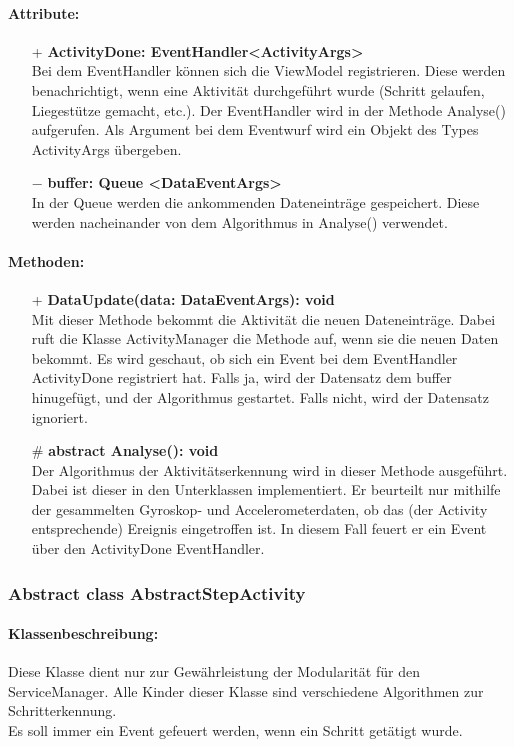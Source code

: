 \documentclass[a4paper,12pt]{article}
\begin{document}
	\paragraph{Attribute:}
	\begin{itemize}
		\item[+] \textbf{ActivityDone: EventHandler<ActivityArgs>}\\Bei dem EventHandler können sich die ViewModel registrieren. Diese werden benachrichtigt, wenn eine Aktivität durchgeführt wurde (Schritt gelaufen, Liegestütze gemacht, etc.). Der EventHandler wird in der Methode Analyse() aufgerufen. Als Argument bei dem Eventwurf wird ein Objekt des Types ActivityArgs übergeben.
		\item [$-$] \textbf{buffer: Queue <DataEventArgs>}\\In der Queue werden die ankommenden Dateneinträge gespeichert. Diese werden nacheinander von dem Algorithmus in Analyse() verwendet. 
	\end{itemize}
	\paragraph{Methoden:}
	\begin{itemize}
		\item[+] \textbf{DataUpdate(data: DataEventArgs): void}\\Mit dieser Methode bekommt die Aktivität die neuen Dateneinträge. Dabei ruft die Klasse ActivityManager die Methode auf, wenn sie die neuen Daten bekommt. Es wird geschaut, ob sich ein Event bei dem EventHandler ActivityDone registriert hat. Falls ja, wird der Datensatz dem buffer hinugefügt, und der Algorithmus gestartet. Falls nicht, wird der Datensatz ignoriert.
		\item[\#] \textbf{abstract Analyse(): void}\\Der Algorithmus der Aktivitätserkennung wird in dieser Methode ausgeführt. Dabei ist dieser in den Unterklassen implementiert. Er beurteilt nur mithilfe der gesammelten Gyroskop- und Accelerometerdaten, ob das (der Activity entsprechende) Ereignis eingetroffen ist. In diesem Fall feuert er ein Event über den ActivityDone EventHandler. 
	\end{itemize}
	\subsubsection{Abstract class AbstractStepActivity}
	\paragraph{Klassenbeschreibung:}
	Diese Klasse dient nur zur Gewährleistung der Modularität für den ServiceManager. Alle Kinder dieser Klasse sind verschiedene Algorithmen zur Schritterkennung.\\ Es soll immer ein Event gefeuert werden, wenn ein Schritt getätigt wurde.
\end{document}
